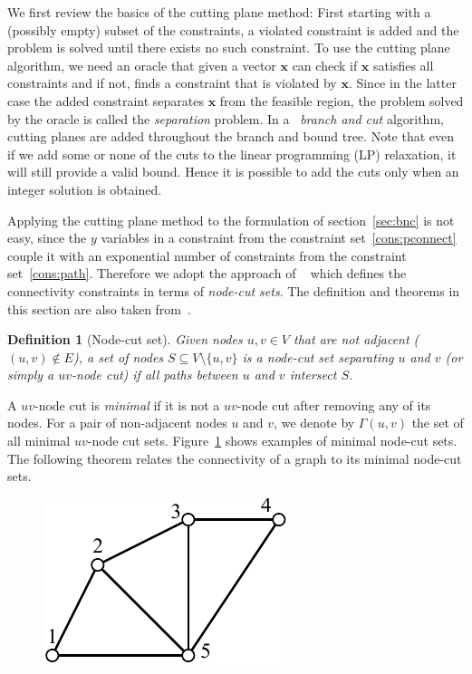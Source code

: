 \documentclass[conference,compsoc]{IEEEtran}
\newcommand{\NDB}[1]{\todo[bordercolor=mhue,linecolor=mhue,color=mhue!40]{Behrouz: #1}}
\newtheorem{definition}{Definition}
\begin{document}
 \NDB{Prune and revise}
 We first review the basics of the cutting plane method: First starting with a (possibly empty) subset of the constraints, a violated constraint is added and the problem is solved until there exists no such constraint. To use the cutting plane algorithm, we need an oracle that given a vector $\mathbf{x}$ can check if $\mathbf{x}$ satisfies all constraints and if not, finds a constraint that is violated by $\mathbf{x}$. Since in the latter case the added constraint separates $\mathbf{x}$ from the feasible region, the problem solved by the oracle is called the \emph{separation} problem. In a ~\emph{branch and cut} algorithm, cutting planes are added throughout the branch and bound tree. Note that even if we add some or none of the cuts to the linear programming (LP) relaxation, it will still provide a valid bound. Hence it is possible to add the cuts only when an integer solution is obtained.

 
 Applying the cutting plane method to the formulation of section~\ref{sec:bnc} is not easy, since the $y$ variables in a constraint from the constraint set~\ref{cons:pconnect} couple it with an exponential number of constraints from the constraint set~\ref{cons:path}. Therefore we adopt the approach of ~\cite{CarvajalCGVW13} which defines the connectivity constraints in terms of \emph{node-cut sets}. The definition and theorems in this section are also taken from~\cite{CarvajalCGVW13}.

\begin{definition}[Node-cut set]
Given nodes $u, v \in V$ that are not adjacent ($(u, v) \notin E$), a set of nodes $S \subseteq V \setminus \{u, v\}$ is a \emph{node-cut set} separating $u$ and $v$ (or simply a \emph{$uv$-node cut}) if all paths between $u$ and $v$ intersect $S$.
\end{definition}

A $uv$-node cut is \emph{minimal} if it is not a $uv$-node cut after removing any of its nodes. For a pair of non-adjacent nodes $u$ and $v$, we denote by $\Gamma(u, v)$ the set of all minimal $uv$-node cut sets. Figure~\ref{fig:cutset} shows examples of minimal node-cut sets. The following theorem relates the connectivity of a graph to its minimal node-cut sets. 

\begin{figure}
\centering
\includegraphics[scale=0.7]{images/cutset}
\captionsetup{font=small}
\label{fig:cutset}
\end{figure}
\end{document}
